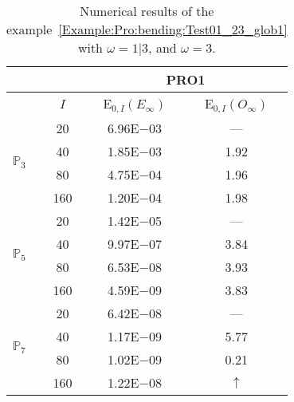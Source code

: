 \begin{table}[H]
\caption{Numerical results of the example~\ref{Example:Pro:bending:Test01_23_glob1} with $\omega=1|3$, and $\omega=3$.}
\setlength{\tabcolsep}{5pt}
\centering
\begin{tabular}{@{}l c c c@{}}
\toprule
 &  & \multicolumn{2}{c}{PRO1}\\
\midrule
 & $I$ & E$_{0,I}(E_{\infty})$ & E$_{0,I}(O_{\infty})$\\
\midrule
\multirow{4}{*}{$\mathbb{P}_{3}$} & 20 & 6.96E$-$03 & ---\\
 & 40 & 1.85E$-$03 & 1.92\\
 & 80 & 4.75E$-$04 & 1.96\\
 & 160 & 1.20E$-$04 & 1.98\\
\midrule
\multirow{4}{*}{$\mathbb{P}_{5}$} & 20 & 1.42E$-$05 & ---\\
 & 40 & 9.97E$-$07 & 3.84\\
 & 80 & 6.53E$-$08 & 3.93\\
 & 160 & 4.59E$-$09 & 3.83\\
\midrule
\multirow{4}{*}{$\mathbb{P}_{7}$} & 20 & 6.42E$-$08 & ---\\
 & 40 & 1.17E$-$09 & 5.77\\
 & 80 & 1.02E$-$09 & 0.21\\
 & 160 & 1.22E$-$08 & $\uparrow$\\
\bottomrule
\end{tabular}
\label{Table:PRO:test_01_23_test15}
\end{table}
